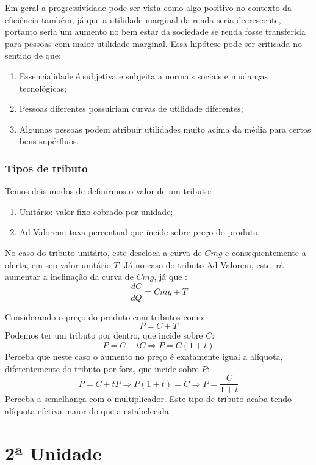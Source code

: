 \documentclass[12pt,a4paper,oneside,brazil]{abntex2}
\begin{document}
Em geral a progressividade pode ser vista como algo positivo no contexto da eficiência também, já que a utilidade marginal da renda seria decrescente, portanto seria um aumento no bem estar da sociedade se renda fosse transferida para pessoas com maior utilidade marginal. Essa hipótese pode ser criticada no sentido de que:
\begin{enumerate}
\item Essencialidade é subjetiva e subjeita a normais sociais e mudanças tecnológicas;
\item Pessoas diferentes possuiriam curvas de utilidade diferentes;
\item Algumas pessoas podem atribuir utilidades muito acima da média para certos bens supérfluos.
\end{enumerate}

\subsection{Tipos de tributo}
Temos dois modos de definirmos o valor de um tributo:
\begin{enumerate}
\item Unitário: valor fixo cobrado por unidade;
\item Ad Valorem: taxa percentual que incide sobre preço do produto.
\end{enumerate}

No caso do tributo unitário, este descloca a curva de $Cmg$ e consequentemente a oferta, em seu valor unitário $T$. Já no caso do tributo Ad Valorem, este irá aumentar a inclinação da curva de $Cmg$, já que :
\[ \frac{d C}{d Q} = Cmg + T \]

Considerando o preço do produto com tributos como:
\[ P = C + T\]
Podemos ter um tributo por dentro, que incide sobre $C$:
\[ P = C + t C \Rightarrow P = C ( 1 + t) \]
Perceba que neste caso o aumento no preço é exatamente igual a alíquota, diferentemente do tributo por fora, que incide sobre $P$:
\[ P = C + t P \Rightarrow P ( 1 + t ) = C \Rightarrow P = \frac{C}{1 + t}\]
Perceba a semelhança com o multiplicador. Este tipo de tributo acaba tendo alíquota efetiva maior do que a estabelecida. 

\chapter{2ª Unidade}
\label{cha:2_unidade}




\printbibliography
\end{document}
